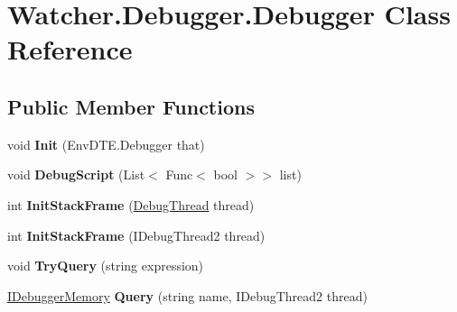 \hypertarget{class_watcher_1_1_debugger_1_1_debugger}{\section{Watcher.\+Debugger.\+Debugger Class Reference}
\label{class_watcher_1_1_debugger_1_1_debugger}
}
\subsection*{Public Member Functions}
\begin{DoxyCompactItemize}
\item 
\hypertarget{class_watcher_1_1_debugger_1_1_debugger_ab38a158487a0431c4592bf0e57bb0141}{void {\bfseries Init} (Env\+D\+T\+E.\+Debugger that)}\label{class_watcher_1_1_debugger_1_1_debugger_ab38a158487a0431c4592bf0e57bb0141}

\item 
\hypertarget{class_watcher_1_1_debugger_1_1_debugger_a71f951a0a4afc0f14d744805287127e0}{void {\bfseries Debug\+Script} (List$<$ Func$<$ bool $>$$>$ list)}\label{class_watcher_1_1_debugger_1_1_debugger_a71f951a0a4afc0f14d744805287127e0}

\item 
\hypertarget{class_watcher_1_1_debugger_1_1_debugger_a4133b90a4abf3d8f5f2c60cf70c77e1a}{int {\bfseries Init\+Stack\+Frame} (\hyperlink{classlib_wather_debugger_1_1_thread_1_1_debug_thread}{Debug\+Thread} thread)}\label{class_watcher_1_1_debugger_1_1_debugger_a4133b90a4abf3d8f5f2c60cf70c77e1a}

\item 
\hypertarget{class_watcher_1_1_debugger_1_1_debugger_a018e4e84f3664c05e3ccabe5cf87aeeb}{int {\bfseries Init\+Stack\+Frame} (I\+Debug\+Thread2 thread)}\label{class_watcher_1_1_debugger_1_1_debugger_a018e4e84f3664c05e3ccabe5cf87aeeb}

\item 
\hypertarget{class_watcher_1_1_debugger_1_1_debugger_a46425618762b1c3e45f982f7f9f68f53}{void {\bfseries Try\+Query} (string expression)}\label{class_watcher_1_1_debugger_1_1_debugger_a46425618762b1c3e45f982f7f9f68f53}

\item 
\hypertarget{class_watcher_1_1_debugger_1_1_debugger_afa72a611db47ddba1cddb49bb9ef1712}{\hyperlink{interfacelib_utilities_1_1_i_debugger_memory}{I\+Debugger\+Memory} {\bfseries Query} (string name, I\+Debug\+Thread2 thread)}\label{class_watcher_1_1_debugger_1_1_debugger_afa72a611db47ddba1cddb49bb9ef1712}


\end{DoxyCompactItemize}
